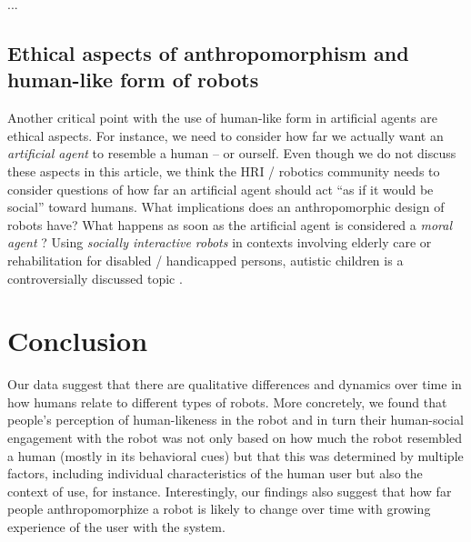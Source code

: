 \documentclass{frontiersSCNS} %
\begin{document}
...

\subsection{Ethical aspects of anthropomorphism and human-like form of robots}


Another critical point with the use of human-like form in artificial agents are 
ethical aspects. For instance, we need to consider how far we actually want an 
\textit{artificial agent} to resemble a human -- or ourself. Even though we do not 
discuss these aspects in this article, we think the HRI / robotics community needs 
to consider questions of how far an artificial agent should act ``as if it would be 
social'' toward humans. What implications does an anthropomorphic design of robots 
have? What happens as soon as the artificial agent is considered a \textit{moral 
agent} \cite{sullins_when_2006}? Using \textit{socially interactive robots} in 
contexts involving elderly care or rehabilitation for disabled / handicapped 
persons, autistic children is a controversially discussed topic 
\cite{robins_robots_2005}.


%
%
%
%
%
%


\section{Conclusion}
\label{sec:conclusion}

Our data suggest that there are qualitative differences and dynamics over time
in how humans relate to different types of robots. More concretely, we found
that people's perception of human-likeness in the robot and in turn their
human-social engagement with the robot was not only based on how much the robot
resembled a human (mostly in its behavioral cues) but that this was determined
by multiple factors, including individual characteristics of the human user but
also the context of use, for instance. Interestingly, our findings also suggest
that how far people anthropomorphize a robot is likely to change over time with
growing experience of the user with the system. 
\end{document}
